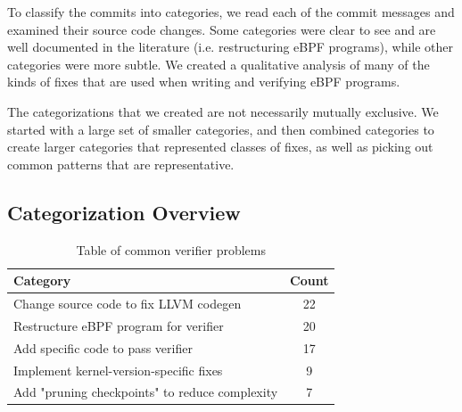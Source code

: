 
To classify the commits into categories, we read each of the commit messages and examined
    their source code changes.
Some categories were clear to see and are well documented in the literature (i.e. restructuring eBPF programs), while other categories were more subtle.
We created a qualitative analysis of many of the kinds of fixes that are used when writing and verifying eBPF programs.

The categorizations that we created are not necessarily mutually exclusive.
We started with a large set of smaller categories, and then combined categories to
    create larger categories that represented classes of fixes, as well as picking out 
    common patterns that are representative.

\subsection{Categorization Overview}

\begin{table}[t]
    \small
    \centering
    \begin{tabular}{lc}%
        \toprule
        \textbf{Category} & \textbf{Count} \\
        \midrule
        Change source code to fix LLVM codegen & 22 \\          %
        Restructure eBPF program for verifier & 20 \\           %
        Add specific code to pass verifier & 17 \\              %
        Implement kernel-version-specific fixes & 9 \\          %
        Add "pruning checkpoints" to reduce complexity & 7 \\   %
        \bottomrule
    \end{tabular}
    \caption{Table of common verifier problems}
    \label{fig:commit-table}
\end{table}

